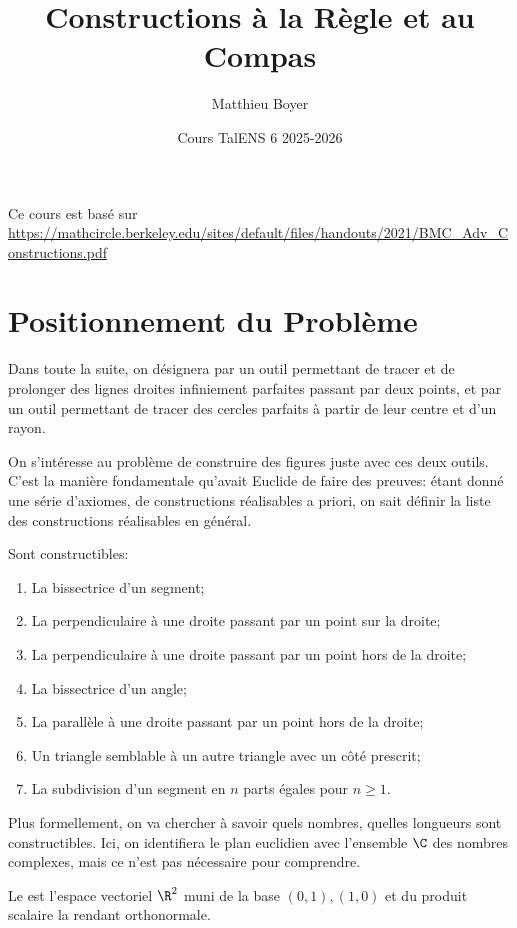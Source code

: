 \documentclass[math, info]{mpb-cours}
\title{Constructions à la Règle et au Compas}
\author{Matthieu Boyer}
\date{Cours TalENS 6 2025-2026}
\begin{document}
\bettertitle

Ce cours est basé sur \url{https://mathcircle.berkeley.edu/sites/default/files/handouts/2021/BMC_Adv_Constructions.pdf}

\section{Positionnement du Problème}

\begin{definition}
	Dans toute la suite, on désignera par  un outil permettant de tracer et de prolonger des
	lignes droites infiniement parfaites passant par deux points, et par  un outil
	permettant de tracer des cercles parfaits à partir de leur centre et d'un rayon.
\end{definition}

On s'intéresse au problème de construire des figures juste avec ces deux outils.
C'est la manière fondamentale qu'avait Euclide de faire des preuves: étant donné une série d'axiomes, de
constructions réalisables a priori, on sait définir la liste des constructions réalisables en général.

\begin{proposition}
	Sont constructibles:
	\begin{enumerate}
		\item La bissectrice d'un segment;
		\item La perpendiculaire à une droite passant par un point sur la droite;
		\item La perpendiculaire à une droite passant par un point hors de la droite;
		\item La bissectrice d'un angle;
		\item La parallèle à une droite passant par un point hors de la droite;
		\item Un triangle semblable à un autre triangle avec un côté prescrit;
		\item La subdivision d'un segment en $n$ parts égales pour $n \geq 1$.
	\end{enumerate}
\end{proposition}

Plus formellement, on va chercher à savoir quels nombres, quelles longueurs sont constructibles. Ici, on
identifiera le plan euclidien avec l'ensemble $\C$ des nombres complexes, mais ce n'est pas nécessaire pour
comprendre.

\begin{definition}
	Le  est l'espace vectoriel $\R^{2}$ muni de la base $(0, 1), (1, 0)$ et du produit
	scalaire la rendant orthonormale.
\end{definition}
\end{document}
